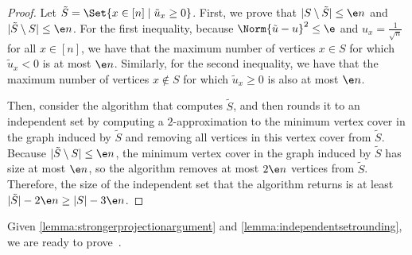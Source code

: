 \begin{proof}
    Let $\tilde{S} = \Set{x \in [n] \mid \tilde{u}_x \geq 0}$.
    First, we prove that $|S \setminus \tilde{S}| \leq \e n$ and $|\tilde{S} \setminus S| \leq \e n$.
    For the first inequality, because $\Norm{\tilde{u}-u}^2\leq \e$ and $u_x = \frac{1}{\sqrt{n}}$ for all $x \in [n]$, we have that the maximum number of vertices $x \in S$ for which $\tilde{u}_x < 0$ is at most $\e n$.
    Similarly, for the second inequality, we have that the maximum number of vertices $x \not\in S$ for which $\tilde{u}_x \geq 0$ is also at most $\e n$.

    Then, consider the algorithm that computes $\tilde{S}$, and then rounds it to an independent set by computing a $2$-approximation to the minimum vertex cover in the graph induced by $\tilde{S}$ and removing all vertices in this vertex cover from $\tilde{S}$.
    Because $|\tilde{S} \setminus S| \leq \e n$, the minimum vertex cover in the graph induced by $\tilde{S}$ has size at most $\e n$, so the algorithm removes at most $2\e n$ vertices from $\tilde{S}$.
    Therefore, the size of the independent set that the algorithm returns is at least $|\tilde{S}| - 2\e n \geq |S| - 3 \e n$.
\end{proof}

Given \cref{lemma:strongerprojectionargument} and \cref{lemma:independentsetrounding}, we are ready to prove~.

